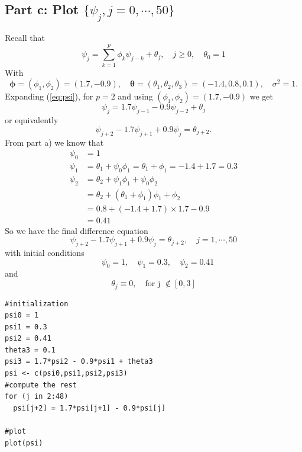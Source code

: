 \documentclass[11pt, oneside]{article}   	%
\begin{document}
\subsection{Part c: Plot $\{\psi_{j},j=0,\cdots,50 \}$}
Recall that 
\begin{equation}\label{eq:psi}
\psi_{j} = \sum_{k=1}^{p}\phi_{k}\psi_{j-k} + \theta_{j}, \quad j \geq 0, \quad \theta_{0} = 1
\end{equation}
With 
\begin{equation}\label{eq:params}
\bm{\phi} = (\phi_{1}, \phi_{2}) = (1.7, -0.9), \quad \bm{\theta} = (\theta_{1}, \theta_{2}, \theta_{3}) = (-1.4, 0.8, 0.1) ,\quad \sigma^{2} = 1 .
\end{equation}
Expanding (\ref{eq:psi}), for $p=2$ and using $(\phi_{1}, \phi_{2}) = (1.7, -0.9)$ we get
\begin{equation}
\psi_{j} = 1.7\psi_{j-1} - 0.9\psi_{j-2} + \theta_{j}
\end{equation}
or equivalently
\begin{equation}
\psi_{j+2} -1.7\psi_{j+1} + 0.9\psi_{j} = \theta_{j+2}.
\end{equation}
From part a) we know that 
\begin{equation}
\begin{aligned}
\psi_{0} &= 1\\
\psi_{1} &= \theta_{1} + \psi_{0}\phi_{1} = \theta_{1} + \phi_{1} = -1.4+1.7 = 0.3\\
\psi_{2} &= \theta_{2} + \psi_{1}\phi_{1} +\psi_{0}\phi_{2} \\
             &= \theta_{2} + ( \theta_{1} + \phi_{1})\phi_{1}+\phi_{2}\\
             &=0.8+(-1.4+1.7)\times 1.7 - 0.9\\
             & = 0.41
\end{aligned}
\end{equation}
So we have the final difference equation
\begin{equation}
\psi_{j+2} -1.7\psi_{j+1} + 0.9\psi_{j} = \theta_{j+2}, \quad j = 1, \cdots, 50
\end{equation}
with initial conditions
\begin{equation}
 \quad \psi_{0} = 1,\quad \psi_{1} = 0.3,\quad \psi_{2} = 0.41
\end{equation}
and
\begin{equation}
\theta_{j} \equiv 0 ,\quad \text{for j $\not\in[0,3]$}
\end{equation}
\clearpage
\begin{lstlisting}
#initialization
psi0 = 1
psi1 = 0.3
psi2 = 0.41
theta3 = 0.1
psi3 = 1.7*psi2 - 0.9*psi1 + theta3
psi <- c(psi0,psi1,psi2,psi3)
#compute the rest
for (j in 2:48)
  psi[j+2] = 1.7*psi[j+1] - 0.9*psi[j]
  
#plot
plot(psi)
\end{lstlisting}
\end{document}
